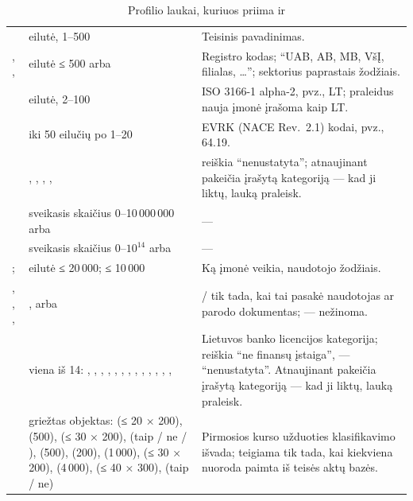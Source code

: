 \begin{table}[H]
\caption{Profilio laukai, kuriuos priima  ir }\label{tab:tools:companyfields}
\begin{tabularx}{\textwidth}{@{}L{39mm}L{43mm}Y@{}}
\toprule
{} &  &  \\
\midrule
{} & eilutė, 1--500 & Teisinis pavadinimas. \\
, ,  & eilutė ≤ 500 arba  & Registro kodas; \enquote{UAB, AB, MB, VšĮ, filialas, …}; sektorius paprastais žodžiais. \\
 & eilutė, 2--100 & ISO 3166-1 alpha-2, pvz., LT; praleidus nauja įmonė įrašoma kaip LT. \\
 & iki 50 eilučių po 1--20 & EVRK (NACE Rev.~2.1) kodai, pvz., 64.19. \\
 & , , , ,  &  reiškia \enquote{nenustatyta}; atnaujinant pakeičia įrašytą kategoriją --- kad ji liktų, lauką praleisk. \\
 & sveikasis skaičius 0--10\,000\,000 arba  & --- \\
 & sveikasis skaičius 0--$10^{14}$ arba  & --- \\
;  & eilutė ≤ 20\,000; ≤ 10\,000 & Ką įmonė veikia, naudotojo žodžiais. \\
, , ,  & ,  arba  & / tik tada, kai tai pasakė naudotojas ar parodo dokumentas;  --- nežinoma. \\
 & viena iš 14: , , , , , , , , , , , , ,  & Lietuvos banko licencijos kategorija;  reiškia \enquote{ne finansų įstaiga},  --- \enquote{nenustatyta}. Atnaujinant  pakeičia įrašytą kategoriją --- kad ji liktų, lauką praleisk. \\
 & griežtas objektas:  (≤ 20 × 200),  (500),  (≤ 30 × 200),  (taip / ne / ),  (500),  (200),  (1\,000),  (≤ 30 × 200),  (4\,000),  (≤ 40 × 300),  (taip / ne) & Pirmosios kurso užduoties klasifikavimo išvada;  teigiama tik tada, kai kiekviena nuoroda paimta iš teisės aktų bazės. \\

\end{tabularx}
\end{table}
